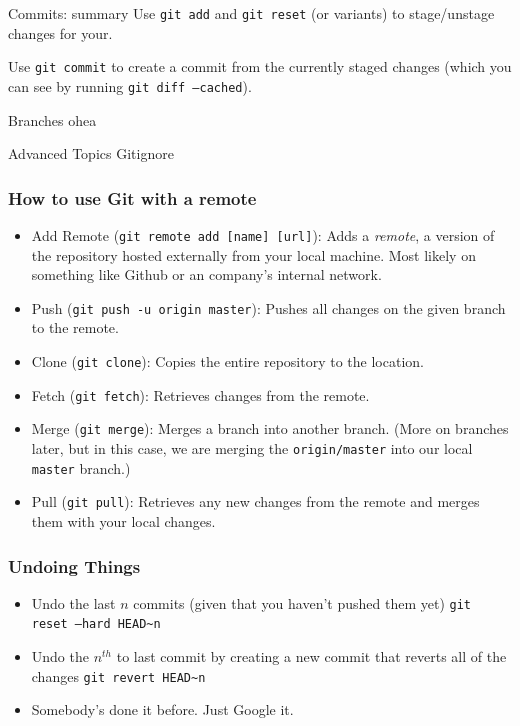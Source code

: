 \documentclass{beeper}
\begin{document}
\begin{frame}{Commits: summary}
    Use \texttt{git add} and \texttt{git reset} (or variants) to stage/unstage
    changes for your.
    \pause

    Use \texttt{git commit} to create a commit from the currently staged changes
    (which you can see by running \texttt{git diff --cached}).
\end{frame}

\begin{frame}{Branches}
    ohea
\end{frame}

\begin{frame}{Advanced Topics}
    Gitignore
\end{frame}

\begin{frame}
    \frametitle{How to use Git with a remote}

    \begin{itemize}
        \item Add Remote (\texttt{git remote add [name] [url]}): Adds a
            \textit{remote}, a version of the repository hosted externally from
            your local machine. Most likely on something like Github or an
            company's internal network.
        \item Push (\texttt{git push -u origin master}): Pushes all changes on
            the given branch to the remote.
        \item Clone (\texttt{git clone}): Copies the entire repository to the
            location.
        \item Fetch (\texttt{git fetch}): Retrieves changes from the remote.
        \item Merge (\texttt{git merge}): Merges a branch into another branch.
            (More on branches later, but in this case, we are merging the
            \texttt{origin/master} into our local \texttt{master} branch.)
        \item Pull (\texttt{git pull}): Retrieves any new changes from the
            remote and merges them with your local changes.
    \end{itemize}
\end{frame}

\begin{frame}
    \frametitle{Undoing Things}

    \begin{itemize}
        \item Undo the last $n$ commits (given that you haven't pushed them yet)
            \texttt{git reset --hard HEAD\textasciitilde n}
        \item Undo the $n^{th}$ to last commit by creating a new commit that
            reverts all of the changes \texttt{git revert HEAD\textasciitilde n}
        \item Somebody's done it before. Just Google it.
    \end{itemize}
\end{frame}
\end{document}
